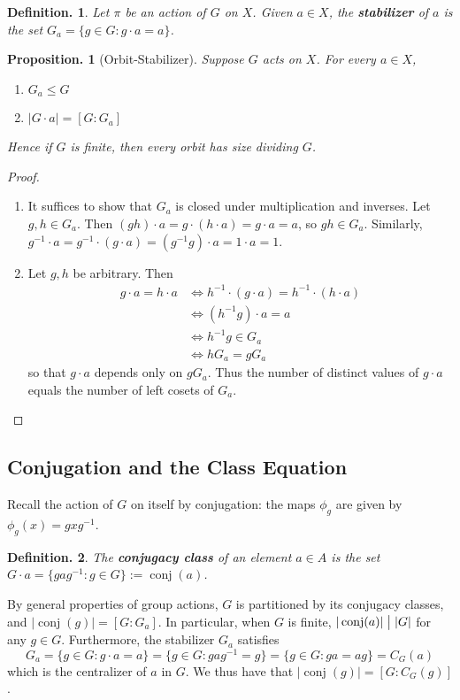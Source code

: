\documentclass[11pt, a4paper]{memoir}
\newcommand{\mbf}[1]{{\boldmath\bfseries #1}}
\renewcommand{\div}{\bigm|}
\theoremstyle{change}
\newtheorem{proposition}[theorem]{Proposition.}
\theoremstyle{plain}
\theoremstyle{nonumberplain}
\newtheorem{definition}{Definition.}
\newtheorem{proof}{Proof}
\DeclareMathOperator{\conj}{conj}
\numberwithin{equation}{section}
\begin{document}
\begin{definition}
    Let $\pi$ be an action of $G$ on $X$.
    Given $a\in X$, the \mbf{stabilizer} of $a$ is the set $G_a=\{g\in G:g\cdot a=a\}$.
\end{definition}
\begin{proposition}[Orbit-Stabilizer]
    Suppose $G$ acts on $X$.
    For every $a\in X$,
    \begin{enumerate}[nolistsep,label=(\roman*)]
        \item $G_a\leq G$
        \item $|G\cdot a|=[G:G_a]$
    \end{enumerate}
    Hence if $G$ is finite, then every orbit has size dividing $G$.
\end{proposition}
\begin{proof}
    \begin{enumerate}
        \item It suffices to show that $G_a$ is closed under multiplication and inverses.
            Let $g,h\in G_a$.
            Then $(gh)\cdot a=g\cdot(h\cdot a)=g\cdot a=a$, so $gh\in G_a$.
            Similarly, $g^{-1}\cdot a=g^{-1}\cdot(g\cdot a)=(g^{-1}g)\cdot a=1\cdot a=1$.
        \item Let $g,h$ be arbitrary.
            Then
            \begin{align*}
                g\cdot a=h\cdot a &\iff h^{-1}\cdot(g\cdot a)=h^{-1}\cdot(h\cdot a)\\
                                  &\iff (h^{-1}g)\cdot a=a\\
                                  &\iff h^{-1}g\in G_a\\
                                  &\iff hG_a=gG_a
            \end{align*}
            so that $g\cdot a$ depends only on $gG_a$.
            Thus the number of distinct values of $g\cdot a$ equals the number of left cosets of $G_a$.
    \end{enumerate}
\end{proof}
\subsection{Conjugation and the Class Equation}
Recall the action of $G$ on itself by conjugation: the maps $\phi_g$ are given by $\phi_g(x)=gxg^{-1}$.
\begin{definition}
    The \mbf{conjugacy class} of an element $a\in A$ is the set $G\cdot a=\{gag^{-1}:g\in G\}:=\conj(a)$.
\end{definition}
By general properties of group actions, $G$ is partitioned by its conjugacy classes, and $|\conj(g)|=[G:G_a]$.
In particular, when $G$ is finite, $|\conj(a)|\div|G|$ for any $g\in G$.
Furthermore, the stabilizer $G_a$ satisfies
\begin{equation*}
    G_a = \{g\in G:g\cdot a=a\}=\{g\in G:gag^{-1}=g\}=\{g\in G:ga=ag\}=C_G(a)
\end{equation*}
which is the centralizer of $a$ in $G$.
We thus have that $|\conj(g)|=[G:C_G(g)]$.
\end{document}
